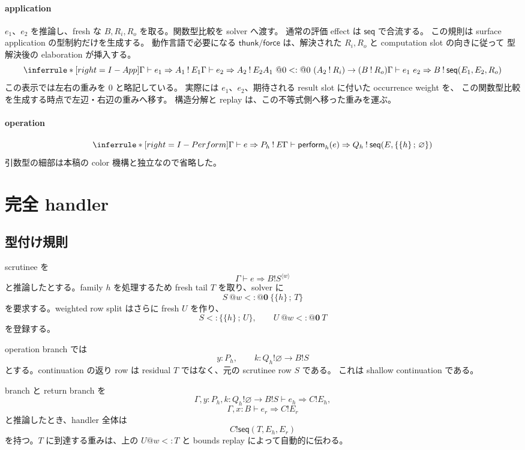 \documentclass[uplatex,dvipdfmx,a4paper,11pt]{jsarticle}
\makeatletter
\theoremstyle{jpplain}
\newcommand{\subty}{\mathrel{<:}}
\newcommand{\eff}{\mathbin{!}}
\newcommand{\row}[2]{\{#1\,;\,#2\}}
\newcommand{\emptyrow}{\varnothing}
\newcommand{\zeroW}{\mathbf 0}
\newcommand{\wocc}[2]{#1^{\langle #2\rangle}}
\newcommand{\wsub}[4]{#1\ @#2\mathrel{<:}@#3\ #4}
\newcommand{\thunk}{\mathsf{thunk}}
\newcommand{\force}{\mathsf{force}}
\newcommand{\perform}{\mathsf{perform}}
\newcommand{\seqeff}{\mathsf{seq}}
\makeatother
\begin{document}
\paragraph{application}
$e_1$、$e_2$ を推論し、fresh な $B,R_i,R_o$ を取る。関数型比較を solver へ渡す。
通常の評価 effect は $\seqeff$ で合流する。
この規則は surface application の型制約だけを生成する。
動作言語で必要になる \(\thunk/\force\) は、解決された \(R_i,R_o\) と computation slot の向きに従って
型解決後の elaboration が挿入する。
\[
\inferrule*[right=I-App]
 {\Gamma\vdash e_1\Rightarrow A_1\eff E_1\\
  \Gamma\vdash e_2\Rightarrow A_2\eff E_2\\
  \wsub{A_1}{0}{0}{(A_2\eff R_i)\to(B\eff R_o)}}
 {\Gamma\vdash e_1\ e_2\Rightarrow B\eff\seqeff(E_1,E_2,R_o)}
\]
この表示では左右の重みを \(0\) と略記している。
実際には \(e_1\)、\(e_2\)、期待される result slot に付いた occurrence weight を、
この関数型比較を生成する時点で左辺・右辺の重みへ移す。
構造分解と replay は、この不等式側へ移った重みを運ぶ。

\paragraph{operation}
\[
\inferrule*[right=I-Perform]
 {\Gamma\vdash e\Rightarrow P_h\eff E}
 {\Gamma\vdash \perform_h(e)\Rightarrow Q_h\eff\seqeff(E,\row{\{h\}}\emptyrow)}
\]
引数型の細部は本稿の color 機構と独立なので省略した。

\section{完全 handler}

\subsection{型付け規則}

scrutinee を
\[
  \Gamma\vdash e\Rightarrow B\eff\wocc S w
\]
と推論したとする。family $h$ を処理するため fresh tail $T$ を取り、solver に
\[
  \wsub{S}{w}{\zeroW}{\row{\{h\}}T}
\]
を要求する。weighted row split はさらに fresh $U$ を作り、
\[
  S\subty\row{\{h\}}U,
  \qquad
  \wsub{U}{w}{\zeroW}{T}
\]
を登録する。

operation branch では
\[
  y:P_h,
  \qquad
  k:Q_h\eff\emptyrow\to B\eff S
\]
とする。continuation の返り row は residual $T$ ではなく、元の scrutinee row $S$ である。
これは shallow continuation である。

branch と return branch を
\[
 \Gamma,y:P_h,k:Q_h\eff\emptyrow\to B\eff S\vdash e_h\Rightarrow C\eff E_h,
\]
\[
 \Gamma,x:B\vdash e_r\Rightarrow C\eff E_r
\]
と推論したとき、handler 全体は
\[
 C\eff\seqeff(T,E_h,E_r)
\]
を持つ。$T$ に到達する重みは、上の $U@w<:T$ と bounds replay によって自動的に伝わる。
\end{document}
